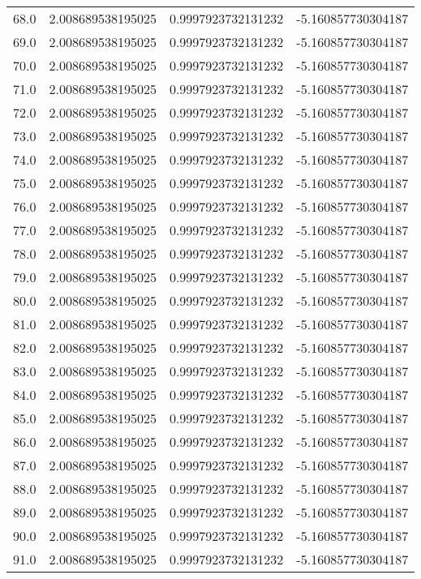 \begin{longtable}{lrrr}
68.0 & 2.008689538195025 & 0.9997923732131232 & -5.160857730304187 \\
69.0 & 2.008689538195025 & 0.9997923732131232 & -5.160857730304187 \\
70.0 & 2.008689538195025 & 0.9997923732131232 & -5.160857730304187 \\
71.0 & 2.008689538195025 & 0.9997923732131232 & -5.160857730304187 \\
72.0 & 2.008689538195025 & 0.9997923732131232 & -5.160857730304187 \\
73.0 & 2.008689538195025 & 0.9997923732131232 & -5.160857730304187 \\
74.0 & 2.008689538195025 & 0.9997923732131232 & -5.160857730304187 \\
75.0 & 2.008689538195025 & 0.9997923732131232 & -5.160857730304187 \\
76.0 & 2.008689538195025 & 0.9997923732131232 & -5.160857730304187 \\
77.0 & 2.008689538195025 & 0.9997923732131232 & -5.160857730304187 \\
78.0 & 2.008689538195025 & 0.9997923732131232 & -5.160857730304187 \\
79.0 & 2.008689538195025 & 0.9997923732131232 & -5.160857730304187 \\
80.0 & 2.008689538195025 & 0.9997923732131232 & -5.160857730304187 \\
81.0 & 2.008689538195025 & 0.9997923732131232 & -5.160857730304187 \\
82.0 & 2.008689538195025 & 0.9997923732131232 & -5.160857730304187 \\
83.0 & 2.008689538195025 & 0.9997923732131232 & -5.160857730304187 \\
84.0 & 2.008689538195025 & 0.9997923732131232 & -5.160857730304187 \\
85.0 & 2.008689538195025 & 0.9997923732131232 & -5.160857730304187 \\
86.0 & 2.008689538195025 & 0.9997923732131232 & -5.160857730304187 \\
87.0 & 2.008689538195025 & 0.9997923732131232 & -5.160857730304187 \\
88.0 & 2.008689538195025 & 0.9997923732131232 & -5.160857730304187 \\
89.0 & 2.008689538195025 & 0.9997923732131232 & -5.160857730304187 \\
90.0 & 2.008689538195025 & 0.9997923732131232 & -5.160857730304187 \\
91.0 & 2.008689538195025 & 0.9997923732131232 & -5.160857730304187 \\

\end{longtable}
